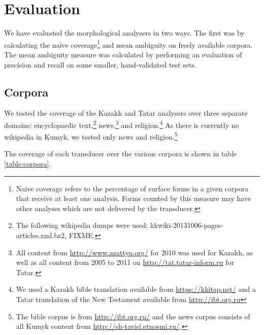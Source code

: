 \documentclass[a4paper,11pt,twocolumn]{article}
\begin{document}
\section{Evaluation}

We have evaluated the morphological analysers in two ways. The first was by calculating the naïve coverage\footnote{Naïve coverage refers to the percentage of surface forms in a given corpora that receive at least one analysis.  Forms counted by this measure may have other analyses which are not delivered by the transducer.} and mean ambiguity  on freely available corpora. The mean ambiguity measure was calculated by performing an evaluation of precision and recall on some smaller, hand-validated test sets.

\subsection{Corpora}

We tested the coverage of the Kazakh and Tatar analysers over three separate domains: encyclopaedic text,\footnote{The following wikipedia dumps were used: kkwiki-20131006-pages-articles.xml.bz2, FIXME.} news,\footnote{All content from \url{http://www.azattyq.org/} for 2010 was used for Kazakh, as well as all content from 2005 to 2011 on \url{http://tat.tatar-inform.ru} for Tatar.} and religion.\footnote{We used a Kazakh bible translation available from \url{https://kkitap.net/} and a Tatar translation of the New Testament available from \url{http://ibt.org.ru}}  As there is currently no wikipedia in Kumyk, we tested only news and religion.\footnote{The bible corpus is from \url{http://ibt.org.ru/} and the news corpus consists of all Kumyk content from \url{http://sh-tavisi.etnosmi.ru/}.}


The coverage of each transducer over the various corpora is shown in table \ref{table:corpora}.
\end{document}
